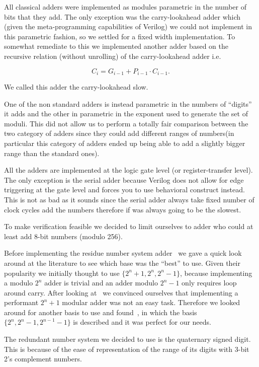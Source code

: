 \documentclass{article}
\begin{document}
All classical adders were implemented as modules parametric in the number of
bits that they add. The only exception was the carry-lookahead adder which
(given the meta-programming capabilities of Verilog) we could not implement in
this parametric fashion, so we settled for a fixed width implementation. To
somewhat remediate to this we implemented another adder based on the recursive
relation (without unrolling) of the carry-lookahead adder i.e.

\begin{displaymath}
C_i = G_{i-1} + P_{i-1} \cdot C_{i-1}\mathrm.
\end{displaymath}

We called this adder the carry-lookahead slow.

One of the non standard adders is instead parametric in the numbers of
``digits'' it adds and the other in parametric in the exponent used to generate
the set of moduli. This did not allow us to perform a totally fair comparison
between the two category of adders since they could add different ranges of
numbers(in particular this category of adders ended up being able to add a
slightly bigger range than the standard ones).

All the adders are implemented at the logic gate level (or register-transfer
level). The only exception is the serial adder because Verilog does not allow
for edge triggering at the gate level and forces you to use behavioral
construct instead. This is not as bad as it sounds since the serial adder always
take fixed number of clock cycles add the numbers therefore if was always going
to be the slowest.

To make verification feasible we decided to limit ourselves to adder who could
at least add 8-bit numbers (modulo 256).

Before implementing the residue number system adder~\cite{rns} we gave a quick
look around at the literature to see which base was the ``best'' to use. Given
their popularity we initially thought to use $\{2^n+1, 2^n, 2^n-1\}$, because
implementing a modulo $2^n$ adder is trivial and an adder modulo $2^n-1$ only
requires loop around carry. After looking at~\cite{modular1, modular2,
modular3} we convinced ourselves that implementing a performant $2^n+1$ modular
adder was not an easy task. Therefore we looked around for another basis to use
and found~\cite{residue}, in which the basis $\{2^n, 2^n-1, 2^{n-1}-1\}$ is
described and it was perfect for our needs.

The redundant number system we decided to use is the quaternary signed digit.
This is because of the ease of representation of the range of its digits with
3-bit 2's complement numbers.
\end{document}
